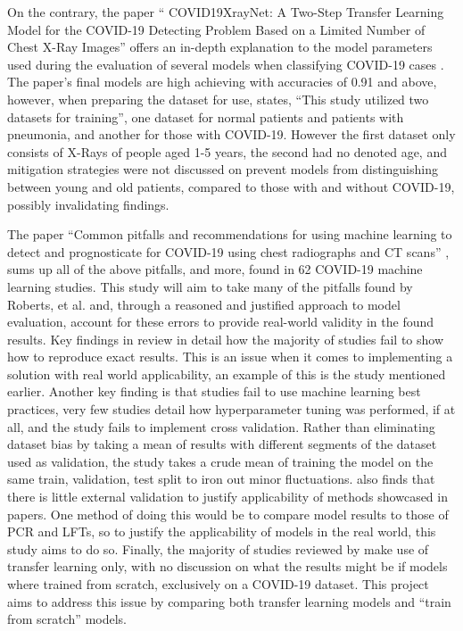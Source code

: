 On the contrary, the paper “ COVID19XrayNet: A Two-Step Transfer Learning Model for the COVID-19 Detecting Problem Based on a Limited Number of Chest X-Ray Images” offers an in-depth explanation to the model parameters used during the evaluation of several models when classifying COVID-19 cases \citep{zhang2020covid19xraynet}. The paper’s final models are high achieving with accuracies of 0.91 and above, however, when preparing the dataset for use, \cite{zhang2020covid19xraynet} states, “This study utilized two datasets for training”, one dataset for normal patients and patients with pneumonia, and another for those with COVID-19. However the first dataset only consists of X-Rays of people aged 1-5 years, the second had no denoted age, and mitigation strategies were not discussed on prevent models from distinguishing between young and old patients, compared to those with and without COVID-19, possibly invalidating findings.

The paper “Common pitfalls and recommendations for using machine learning to detect and prognosticate for COVID-19 using chest radiographs and CT scans” \citep{roberts2021common}, sums up all of the above pitfalls, and more, found in 62 COVID-19 machine learning studies. This study will aim to take many of the pitfalls found by Roberts, et al. and, through a reasoned and justified approach to model evaluation, account for these errors to provide real-world validity in the found results. Key findings in \cite{roberts2021common} review in detail how the majority of studies fail to show how to reproduce exact results. This is an issue when it comes to implementing a solution with real world applicability, an example of this is the \cite{bressem2020comparing} study mentioned earlier. Another key finding is that studies fail to use machine learning best practices, very few studies detail how hyperparameter tuning was performed, if at all, and the \cite{bressem2020comparing} study fails to implement cross validation. Rather than eliminating dataset bias by taking a mean of results with different segments of the dataset used as validation, the study takes a crude mean of training the model on the same train, validation, test split to iron out minor fluctuations. \cite{roberts2021common} also finds that there is little external validation to justify applicability of methods showcased in papers. One method of doing this would be to compare model results to those of PCR and LFTs, so to justify the applicability of models in the real world, this study aims to do so. Finally, the majority of studies reviewed by \cite{roberts2021common} make use of transfer learning only, with no discussion on what the results might be if models where trained from scratch, exclusively on a COVID-19 dataset. This project aims to address this issue by comparing both transfer learning models and “train from scratch” models.
